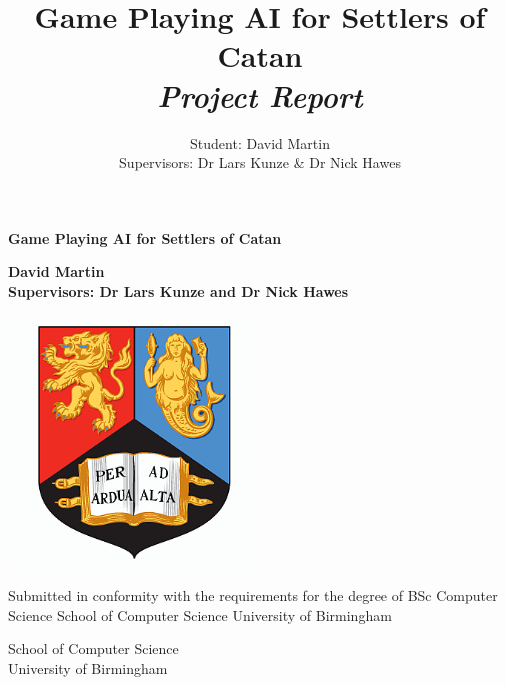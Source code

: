 \documentclass[]{article}
\title{Game Playing AI for Settlers of Catan
\\ \textit{Project Report}}
\author{Student: David Martin 
\\ Supervisors: Dr Lars Kunze & Dr Nick Hawes}
\date{}
\begin{document}
\begin{titlepage}
    \begin{center}
        \vspace*{1cm}
        
        \textbf{Game Playing AI for Settlers of Catan}
        
        \vspace{0.5cm}
        
        \vspace{1.5cm}
        
        \textbf{David Martin} 
        \\
        \textbf{Supervisors: Dr Lars Kunze and Dr Nick Hawes}
       	
       	\vspace{1.5cm}
       	
        \includegraphics[width=0.5\textwidth]{images/logo}
  
		\vspace{1.5cm}  
  
        \parbox[][][c]{0.5\textwidth}{\centering Submitted in conformity with the requirements
                       for the degree of BSc Computer Science
                       School of Computer Science
                       University of Birmingham}

     
       
        
        \vfill
        
        \vspace{0.8cm}
        
        
       	School of Computer Science\\
        University of Birmingham\\
       
        
    \end{center}
\end{titlepage}
\end{document}
